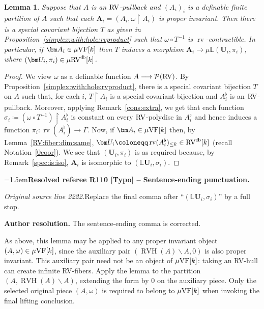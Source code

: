 \documentclass[12pt]{amsart}
\newcommand{\ResolvedRefereeRemark}[5]{%
  \par\medskip\begingroup\normalfont\small\color{gray}%
  \emergencystretch=1.5em\noindent\textbf{Resolved referee R#1 [#2] -- #3.}\par\nobreak\noindent #4\par
  \medskip\color{ResolutionGreen}\noindent\textbf{Author resolution.} #5\par
  \endgroup\medskip
}
\theoremstyle{plain}
\newtheorem{lem}[thm]{Lemma}
\theoremstyle{definition}
\theoremstyle{remark}
\numberwithin{equation}{section}
\theoremstyle{plain}
\newcommand{\VF}{\textup{VF}}
\newcommand{\RV}{\textup{RV}}
\newcommand{\0}{\emptyset}
\newcommand{\mdl}[1]{\mathcal{#1}}  %
\newcommand{\bb}[1]{\mathbb{#1}}
\newcommand{\rest}{\upharpoonright}
\newcommand{\fun}{\longrightarrow}
\newcommand{\mi}{\smallsetminus}
\newcommand{\mVF}{{\mu}{\VF}}
\newcommand{\mRV}{{\mu}{\RV}}
\newcommand{\mL}{{\mu}{\bb L}}
\DeclareMathOperator{\rv}{rv}
\DeclareMathOperator{\RVH}{RVH}
\DeclareMathOperator{\db}{d \! b}
\begin{document}
\begin{lem}\label{L:measure:surjective}
Suppose that $A$ is an $\RV$-pullback and  $(A_i)_i$ is a definable finite partition of $A$ such that each $\bm A_i = (A_i, \omega \rest A_i)$ is proper invariant. Then there is a special covariant bijection $T$ as given in Proposition~\ref{simplex:with:hole:rvproduct} such that $\omega \circ T^{-1}$ is $\rv$-contractible. In particular, if $\bm A_i \in \mVF[k]$ then $T$ induces a morphism  $\bm A_i \fun \mL(\bm U_i, \pi_i)$, where $(\bm U_i, \pi_i) \in \mRV^{\db}[k]$.
\end{lem}
\begin{proof}
We view $\omega$ as a definable function $A \fun \mdl P(\RV)$. By Proposition~\ref{simplex:with:hole:rvproduct}, there is a special covariant bijection $T$ on $A$ such that, for each $i$, $T \rest A_{i}$ is a special covariant bijection and $A_{i}^\flat$ is an $\RV$-pullback. Moreover, applying Remark~\ref{cons:extra}, we get that each function $\sigma_i \coloneqq (\omega \circ T^{-1}) \rest A_{i}^\flat$ is constant on every $\RV$-polydisc in $A_{i}^\flat$ and hence induces a function $\pi_i : \rv(A_{i}^\flat) \fun \Gamma$. Now, if $\bm A_i \in \mVF[k]$ then, by Lemma~\ref{RV:fiber:dim:same}, $\bm U_i\coloneqq \rv(A_{i}^\flat)_{\leq k} \in \RV^{\db}[k]$ (recall Notation~\ref{0coor}). We see that $(\bm U_i, \pi_i)$ is as required because, by Remark~\ref{spec:is:iso}, $\bm A_i$ is isomorphic to $(\mathbb{L} \bm U_i, \sigma_i)$.
\end{proof}

\ResolvedRefereeRemark{110}{Typo}{Sentence-ending punctuation}{%
\textit{Original source line 2222.}\quad Replace the final comma after ``$(\mathbb L\bm U_i,\sigma_i)$'' by a full stop.
}{The sentence-ending comma is corrected.}

As above, this lemma may be applied to any proper invariant object $(A, \omega) \in \mVF[k]$, since the auxiliary pair $(\RVH(A)\mi A,0)$ is also proper invariant. This auxiliary pair need not be an object of $\mVF[k]$: taking an RV-hull can create infinite RV-fibers. Apply the lemma to the partition $(A,\RVH(A)\mi A)$, extending the form by $0$ on the auxiliary piece. Only the selected original piece $(A,\omega)$ is required to belong to $\mVF[k]$ when invoking the final lifting conclusion.
\end{document}
